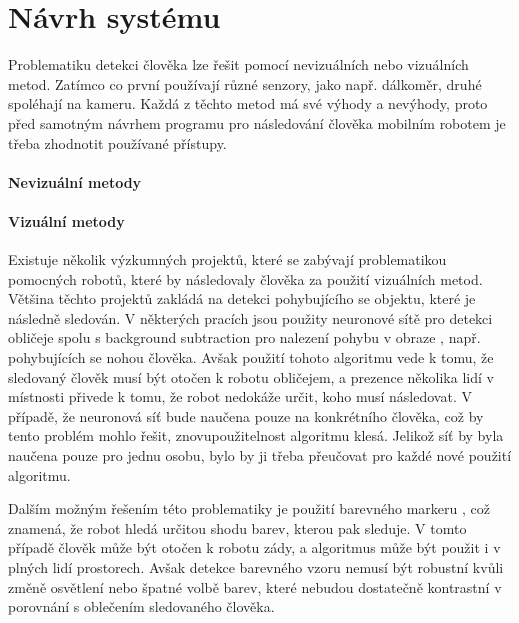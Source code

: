 \documentclass[twoside]{ctuthesis}
\theoremstyle{plain}
\theoremstyle{definition}
\theoremstyle{note}
\begin{document}
\chapter{Návrh systému}


Problematiku detekci člověka lze řešit pomocí nevizuálních nebo vizuálních metod. Zatímco co první používají různé senzory, jako např. dálkoměr, druhé spoléhají na kameru. Každá z těchto metod má své výhody a nevýhody, proto před samotným návrhem programu pro následování člověka mobilním robotem je třeba zhodnotit používané přístupy.

\subsubsection{Nevizuální metody} 

\subsubsection{Vizuální metody}

Existuje několik výzkumných projektů, které se zabývají problematikou pomocných robotů, které by následovaly člověka za použití vizuálních metod. Většina těchto projektů zakládá na detekci pohybujícího se objektu, které je následně sledován. V některých pracích jsou použity neuronové sítě pro detekci obličeje spolu s background subtraction pro nalezení pohybu v obraze \cite{cite:19}, např. pohybujících se nohou člověka. Avšak použití tohoto algoritmu vede k tomu, že sledovaný člověk musí být otočen k robotu obličejem, a prezence několika lidí v místnosti přivede k tomu, že robot nedokáže určit, koho musí následovat. V případě, že neuronová síť bude naučena pouze na konkrétního člověka, což by tento problém mohlo řešit, znovupoužitelnost algoritmu klesá. Jelikož síť by byla naučena pouze pro jednu osobu, bylo by ji třeba přeučovat pro každé nové použití algoritmu.

Dalším možným řešením této problematiky je použití barevného markeru \cite{cite:18}, což znamená, že robot hledá určitou shodu barev, kterou pak sleduje. V tomto případě člověk může být otočen k robotu zády, a algoritmus může být použit i v plných lidí prostorech. Avšak detekce barevného vzoru nemusí být robustní kvůli změně osvětlení nebo špatné volbě barev, které nebudou dostatečně kontrastní v porovnání s oblečením sledovaného člověka.
\end{document}
